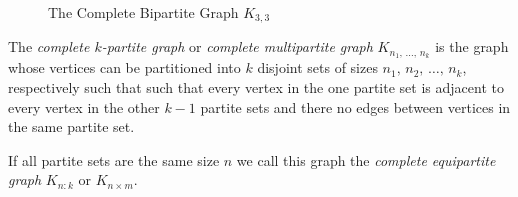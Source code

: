 \begin{figure}[H]
    \begin{center}
    \end{center}
    \caption{The Complete Bipartite Graph \( K_{3,3} \)}
    \label{fig:complete_bipartite_k33}
    \end{figure}
    
  
\begin{definition}
The \textit{complete $k$-partite graph} or \textit{complete multipartite graph} $K_{n_1,\,\dots,\,n_k}$ is the graph whose vertices can be partitioned into $k$ disjoint sets of sizes $n_1,\,n_2,\,\hdots,\,n_k$, respectively such that such that every vertex in the one partite set is adjacent to every vertex in the other $k-1$ partite sets and there no edges between vertices in the same partite set.

If all partite sets are the same size $n$ we call this graph the \textit{complete equipartite graph} $K_{n:k}$ or $K_{n\times m}$.
\end{definition}

